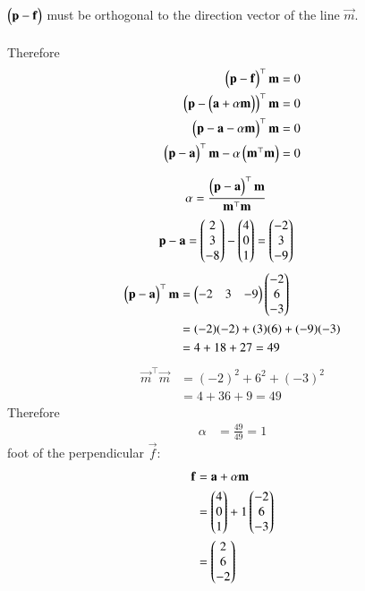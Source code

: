 \documentclass[journal]{IEEEtran}
\begin{document}
$\begin{pmatrix}\mathbf{p} - \mathbf{f}\end{pmatrix}$ must be orthogonal to the direction vector of the line $\vec{m}$.\\ \\
Therefore
\begin{align}
\begin{pmatrix}\mathbf{p} - \mathbf{f}\end{pmatrix}^\top \mathbf{m} = 0\\
\begin{pmatrix}\mathbf{p} - \begin{pmatrix}\mathbf{a} + \alpha\mathbf{m}\end{pmatrix}\end{pmatrix}^\top \mathbf{m} = 0\\
\begin{pmatrix}\mathbf{p} - \mathbf{a} - \alpha\mathbf{m}\end{pmatrix}^\top \mathbf{m} = 0\\
\begin{pmatrix}\mathbf{p} - \mathbf{a}\end{pmatrix}^\top \mathbf{m} - \alpha \begin{pmatrix}\mathbf{m}^\top \mathbf{m}\end{pmatrix} = 0
\end{align}

\begin{align}
\alpha &= \frac{\begin{pmatrix}\mathbf{p}-\mathbf{a}\end{pmatrix}^\top \mathbf{m}}{\mathbf{m}^\top \mathbf{m}}
\end{align}
\begin{align}
\mathbf{p}-\mathbf{a} &= \begin{pmatrix}2 \\ 3 \\ -8\end{pmatrix} - \begin{pmatrix}4 \\ 0 \\ 1\end{pmatrix} = \begin{pmatrix}-2 \\ 3 \\ -9\end{pmatrix}
\end{align}
\begin{align}
\begin{pmatrix}\mathbf{p}-\mathbf{a}\end{pmatrix}^\top \mathbf{m} &= \begin{pmatrix}-2 & 3 & -9\end{pmatrix} \begin{pmatrix}-2 \\ 6 \\ -3\end{pmatrix} \\
&= (-2)(-2) + (3)(6) + (-9)(-3) \\
&= 4 + 18 + 27 = 49
\end{align}
\begin{align}
\vec{m}^\top \vec{m} &= (-2)^2 + 6^2 + (-3)^2 \\
&= 4 + 36 + 9 = 49
\end{align}
Therefore
\begin{align}
\alpha &= \frac{49}{49} = 1
\end{align}
foot of the perpendicular $\vec{f}$:
\begin{align}
\mathbf{f} &= \mathbf{a} + \alpha\mathbf{m} \\
&= \begin{pmatrix}4 \\ 0 \\ 1\end{pmatrix} + 1 \begin{pmatrix}-2 \\ 6 \\ -3\end{pmatrix} \\
&= \begin{pmatrix}2 \\ 6 \\ -2\end{pmatrix}
\end{align}
\end{document}
